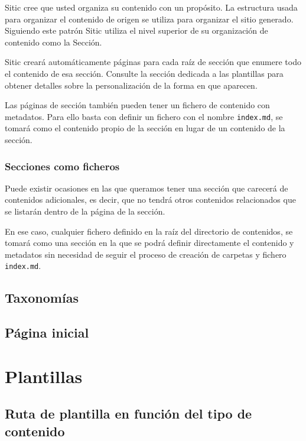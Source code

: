 Sitic cree que usted organiza su contenido con un propósito. La estructura usada
para organizar el contenido de origen se utiliza para organizar el sitio generado. Siguiendo
este patrón Sitic utiliza el nivel superior de su organización de contenido como la Sección.

Sitic creará automáticamente páginas para cada raíz de sección que enumere todo el contenido
de esa sección. Consulte la sección dedicada a las plantillas para obtener detalles sobre
la personalización de la forma en que aparecen.

Las páginas de sección también pueden tener un fichero de contenido con metadatos. Para ello basta con
definir un fichero con el nombre \texttt{index.md}, se tomará como el contenido propio de la sección en
lugar de un contenido de la sección.

\subsubsection{Secciones como ficheros}

Puede existir ocasiones en las que queramos tener una sección que carecerá de contenidos adicionales,
es decir, que no tendrá otros contenidos relacionados que se listarán dentro de la página de la sección.

En ese caso, cualquier fichero definido en la raíz del directorio de contenidos, se tomará como una sección
en la que se podrá definir directamente el contenido y metadatos sin necesidad de seguir el proceso de creación
de carpetas y fichero \texttt{index.md}.

\subsection{Taxonomías}

\subsection{Página inicial}


\section{Plantillas}

\subsection{Ruta de plantilla en función del tipo de contenido}

